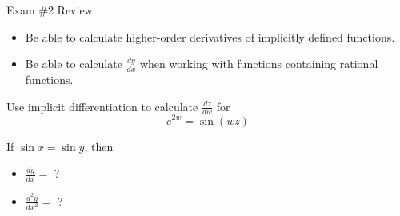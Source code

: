 \documentclass[cal1spr16Lectures.tex]{subfiles}
\begin{document}
\begin{frame}[allowframebreaks]{Exam \#2 Review}
\begin{itemize}
\begin{itemize}
	\item Be able to calculate higher-order derivatives of implicitly defined functions.
	\item Be able to calculate $\textstyle\frac{dy}{dx}$ when working with functions containing rational functions.
	\end{itemize}
%
\begin{exe} Use implicit differentiation to calculate $\textstyle\frac{dz}{dw}$ for
\[e^{2w}=\sin(wz)\]
\end{exe}
\begin{exe} If $\sin x=\sin y$, then 
\begin{itemize}\footnotesize
\item $\textstyle\frac{dy}{dx}=$ ? 
\item $\textstyle\frac{d^2y}{dx^2}=$ ? 
\end{itemize}
\end{exe}
\end{itemize}
\end{frame}

\end{document}
